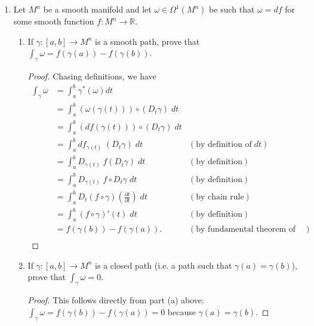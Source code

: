 \documentclass{article}
\begin{document}
\begin{enumerate}[label={\bf Q\arabic*:}]
  \item Let $M^n$ be a smooth manifold and let $\omega\in\Omega^1(M^n)$ be
    such that $\omega=df$ for some smooth function
    $f:M^n\rightarrow\mathbb{R}$.

    \begin{enumerate}
      \item If $\gamma:[a,b]\rightarrow M^n$ is a smooth path, prove that
        $\int_\gamma\omega=f(\gamma(a))-f(\gamma(b))$.
        \begin{proof}
          Chasing definitions, we have
          \begin{align*}
            \int_\gamma\omega &=\int_a^b\gamma^*(\omega)dt \\
              &=\int_a^b(\omega(\gamma(t))) \circ(D_t\gamma)\; dt \\
              &=\int_a^b(df(\gamma(t))) \circ(D_t\gamma)\; dt \\
              &=\int_a^b df_{\gamma(t)}\; (D_t\gamma)\; dt &(\text{by
                definition of}\; dt) \\
              &=\int_a^b D_{\gamma(t)}\; f(D_t\gamma)\; dt &(\text{by
                definition}) \\
              &=\int_a^b D_{\gamma(t)}\; f\circ D_t\gamma\; dt &(\text{by
                definition}) \\
              &=\int_a^b D_{t}(f\circ\gamma)(\frac{\partial t}{\partial
                t})\; dt &(\text{by chain rule}) \\
              &=\int_a^b (f\circ\gamma)'(t)\; dt &(\text{by definition}) \\
              &=f(\gamma(b))-f(\gamma(a)). &(\text{by fundamental theorem of
                calculus}) \\
          \end{align*}
        \end{proof}

      \item If $\gamma:[a,b]\rightarrow M^n$ is a closed path (i.e. a path
        such that $\gamma(a)=\gamma(b)$), prove that $\int_\gamma\omega=0$.
        \begin{proof}
          This follows directly from part (a) above:
          $\int_\gamma\omega=f(\gamma(b))-f(\gamma(a))=0$ because
          $\gamma(a)=\gamma(b)$.
        \end{proof}
    \end{enumerate}
\end{enumerate}
\end{document}
